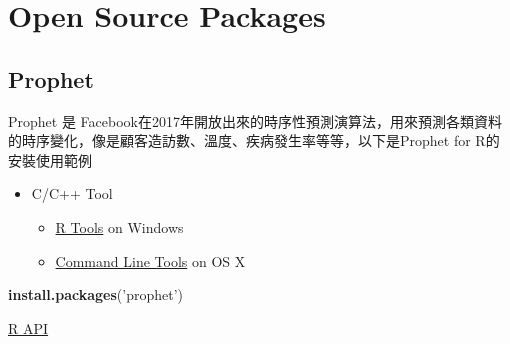 \documentclass[]{book}
\newenvironment{Shaded}{\begin{snugshade}}{\end{snugshade}}
\newcommand{\DataTypeTok}[1]{\textcolor[rgb]{0.13,0.29,0.53}{#1}}
\newcommand{\DecValTok}[1]{\textcolor[rgb]{0.00,0.00,0.81}{#1}}
\newcommand{\KeywordTok}[1]{\textcolor[rgb]{0.13,0.29,0.53}{\textbf{#1}}}
\newcommand{\NormalTok}[1]{#1}
\newcommand{\OperatorTok}[1]{\textcolor[rgb]{0.81,0.36,0.00}{\textbf{#1}}}
\newcommand{\StringTok}[1]{\textcolor[rgb]{0.31,0.60,0.02}{#1}}
\providecommand{\tightlist}{%
  \setlength{\itemsep}{0pt}\setlength{\parskip}{0pt}}
\begin{document}
\hypertarget{open-source-packages}{%
\section{Open Source Packages}\label{open-source-packages}}

\hypertarget{prophet}{%
\subsection{Prophet}\label{prophet}}

Prophet 是 Facebook在2017年開放出來的時序性預測演算法，用來預測各類資料的時序變化，像是顧客造訪數、溫度、疾病發生率等等，以下是Prophet for R的安裝使用範例

\begin{itemize}
\tightlist
\item
  C/C++ Tool

  \begin{itemize}
  \tightlist
  \item
    \href{https://cran.r-project.org/bin/windows/Rtools/}{R Tools} on Windows
  \item
    \href{http://osxdaily.com/2014/02/12/install-command-line-tools-mac-os-x/}{Command Line Tools} on OS X
  \end{itemize}
\end{itemize}

\begin{Shaded}
\begin{Highlighting}[]
\KeywordTok{install.packages}\NormalTok{(}\StringTok{'prophet'}\NormalTok{)}
\end{Highlighting}
\end{Shaded}

\href{https://facebookincubator.github.io/prophet/docs/quick_start.html\#r-api}{R API}

\begin{Shaded}
\end{Shaded}
\end{document}
